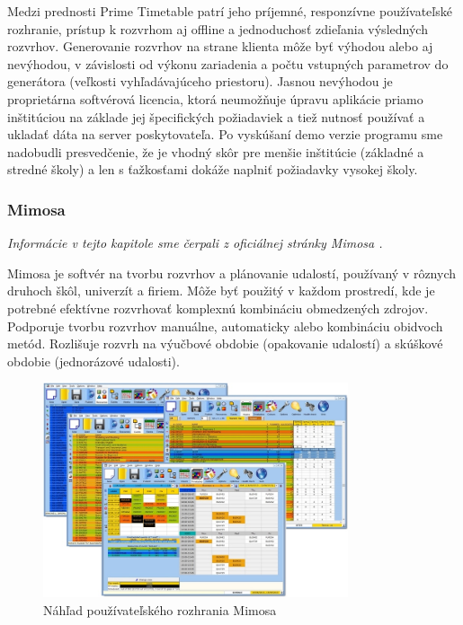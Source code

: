 Medzi prednosti Prime Timetable patrí jeho príjemné, responzívne používateľské
rozhranie, prístup k rozvrhom aj offline a jednoduchosť zdieľania výsledných
rozvrhov. Generovanie rozvrhov na strane klienta môže byť výhodou alebo aj
nevýhodou, v závislosti od výkonu zariadenia a počtu vstupných parametrov do
generátora (veľkosti vyhľadávajúceho priestoru). Jasnou nevýhodou je
proprietárna softvérová licencia, ktorá neumožňuje úpravu aplikácie priamo
inštitúciou na základe jej špecifických požiadaviek a tiež nutnosť používať a
ukladať dáta na server poskytovateľa. Po vyskúšaní demo verzie programu sme
nadobudli presvedčenie, že je vhodný skôr pre menšie inštitúcie (základné a
stredné školy) a len s ťažkosťami dokáže naplniť požiadavky vysokej školy.

\subsubsection{Mimosa}
\label{subsubsec:mimosa}

\emph{Informácie v tejto kapitole sme čerpali z oficiálnej stránky Mimosa
  \cite{mimosa}.}

Mimosa je softvér na tvorbu rozvrhov a plánovanie udalostí, používaný v rôznych
druhoch škôl, univerzít a firiem. Môže byť použitý v každom prostredí, kde je
potrebné efektívne rozvrhovať komplexnú kombináciu obmedzených zdrojov.
Podporuje tvorbu rozvrhov manuálne, automaticky alebo kombináciu obidvoch metód.
Rozlišuje rozvrh na výučbové obdobie (opakovanie udalostí) a skúškové obdobie
(jednorázové udalosti).

\begin{figure}
  \centering
  \includegraphics[width=0.8\textwidth]{figures/mimosa.jpg}
  \caption{\label{fig:mimosa} Náhľad používateľského rozhrania Mimosa
    \cite{soft112}}
\end{figure}

